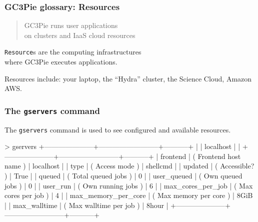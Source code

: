 \documentclass[english,serif,mathserif,usenames,dvipsnames]{beamer}
\begin{document}
\begin{frame}
  \frametitle{GC3Pie glossary: Resources}
  \begin{quote}
    GC3Pie runs user applications
    \\
    on \alert{clusters and IaaS cloud} resources
  \end{quote}

  \+ \alert{\texttt{Resource}s are the computing infrastructures \\ where GC3Pie executes applications.}

  \+ Resources include: your laptop, the ``Hydra'' cluster, the Science Cloud, Amazon AWS.
\end{frame}


\begin{frame}[fragile]
  \frametitle{The \texttt{gservers} command}

  The \texttt{gservers} command is used to see \alert<2>{configured} and
  available resources.

\+
\begin{stdout}
> gservers
+---------------------+--------------------------+-----------+
|                     | localhost                |           |
+---------------------+--------------------------+-----------+
|            frontend | ( Frontend host name )   | localhost |
|                type | ( Access mode )          | shellcmd  |
|             updated | ( Accessible? )          | True      |
|              queued | ( Total queued jobs )    | 0         |
|         user_queued | ( Own queued jobs )      | 0         |
|            user_run | ( Own running jobs )     | 6         |
|   max_cores_per_job | ( Max cores per job )    | 4         |
| max_memory_per_core | ( Max memory per core )  | 8GiB      |
|        max_walltime | ( Max walltime per job ) | 8hour     |
+---------------------+--------------------------+-----------+
\end{stdout}

\end{frame}
\end{document}
